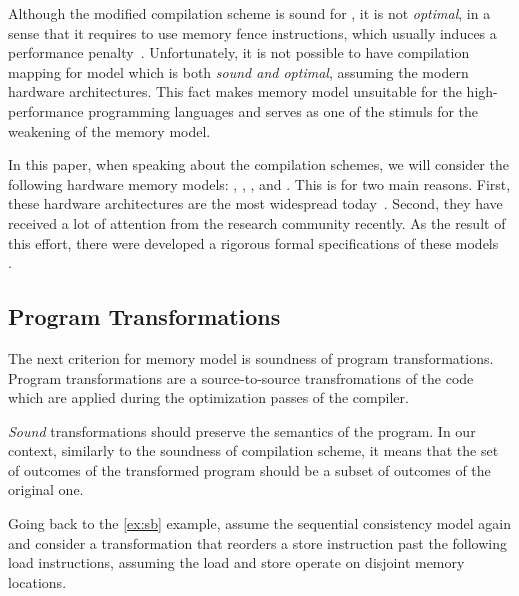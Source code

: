 Although the modified compilation scheme is sound for \SC, 
it is not \emph{optimal}, in a sense that 
it requires to use memory fence instructions, 
which usually induces a performance penalty~\cite{Marino-al:PLDI11, Liu-al:OOPSLA17}.
Unfortunately, it is not possible to have compilation mapping 
for \SC model which is both \emph{sound and optimal}, 
assuming the modern hardware architectures.     
This fact makes \SC memory model unsuitable  
for the high-performance programming languages
and serves as one of the stimuls for the weakening 
of the memory model. 
 
In this paper, when speaking about the compilation schemes, 
we will consider the following hardware memory models:
\xTSO, \POWER, , and . 
This is for two main reasons. 
First, these hardware architectures are the 
most widespread today~\cite{}. 
Second, they have received a lot of attention 
from the research community recently. 
As the result of this effort, 
there were developed a rigorous formal 
specifications of these models~%
\cite{Sewell-al:CACM10, Sarkar-al:PLDI11, 
Flur-al:POPL16, Pulte-al:POPL18}. 

\subsection{Program Transformations}
\label{sec:background:trans}

The next criterion for memory model is 
soundness of program transformations. 
Program transformations are a source-to-source
transfromations of the code which are applied 
during the optimization passes of the compiler. 

\emph{Sound} transformations should preserve the semantics 
of the program. In our context, similarly to the 
soundness of compilation scheme, it means that 
the set of outcomes of the transformed program 
should be a subset of outcomes of the original one. 

Going back to the \ref{ex:sb} example, 
assume the sequential consistency model again and
consider a transformation that reorders 
a store instruction past the following load 
instructions, assuming the load and store
operate on disjoint memory locations.

